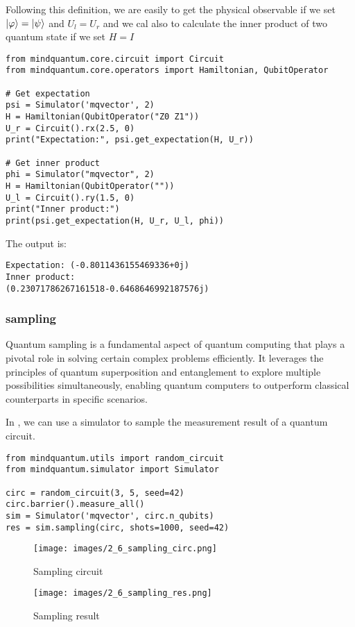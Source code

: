 Following this definition, we are easily to get the physical observable if we set $\ket{\varphi}=\ket{\psi}$ and $U_l = U_r$ and we cal also to calculate the inner product of two quantum state if we set $H=I$

\begin{lstlisting}
from mindquantum.core.circuit import Circuit
from mindquantum.core.operators import Hamiltonian, QubitOperator

# Get expectation
psi = Simulator('mqvector', 2)
H = Hamiltonian(QubitOperator("Z0 Z1"))
U_r = Circuit().rx(2.5, 0)
print("Expectation:", psi.get_expectation(H, U_r))

# Get inner product
phi = Simulator("mqvector", 2)
H = Hamiltonian(QubitOperator(""))
U_l = Circuit().ry(1.5, 0)
print("Inner product:")
print(psi.get_expectation(H, U_r, U_l, phi))
\end{lstlisting}
The output is:

\begin{lstlisting}
Expectation: (-0.8011436155469336+0j)
Inner product:
(0.23071786267161518-0.6468646992187576j)
\end{lstlisting}

\subsubsection{sampling}

Quantum sampling is a fundamental aspect of quantum computing that plays a pivotal role in solving certain complex problems efficiently. It leverages the principles of quantum superposition and entanglement to explore multiple possibilities simultaneously, enabling quantum computers to outperform classical counterparts in specific scenarios.

In \MindQuantum, we can use a simulator to sample the measurement result of a quantum circuit.
\begin{lstlisting}
from mindquantum.utils import random_circuit
from mindquantum.simulator import Simulator

circ = random_circuit(3, 5, seed=42)
circ.barrier().measure_all()
sim = Simulator('mqvector', circ.n_qubits)
res = sim.sampling(circ, shots=1000, seed=42)
\end{lstlisting}

\begin{figure}[h]
    \begin{center}
        \texttt{[image: images/2\_6\_sampling\_circ.png]}
    \end{center}
    \caption{Sampling circuit}
\end{figure}

\begin{figure}[h]
    \begin{center}
        \texttt{[image: images/2\_6\_sampling\_res.png]}
    \end{center}
    \caption{Sampling result}
\end{figure}
